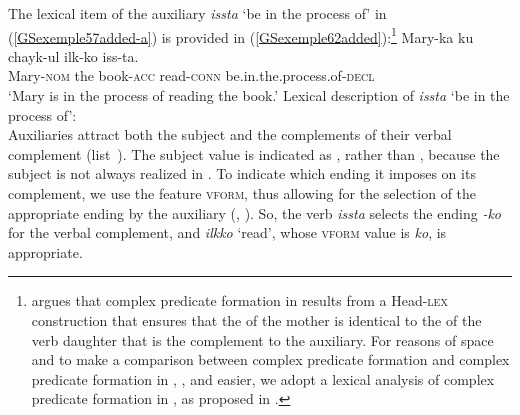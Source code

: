 The lexical item of the auxiliary \emph{issta} `be in the process of' in
(\ref{GSexemple57added-a}) is provided in (\ref{GSexemple62added}):\footnote{%
\citet[--95]{Kim2016a-u} argues that complex predicate formation in  results from a Head-\textsc{lex}
construction that ensures that the \compsl of the mother is identical to the \compsl of the verb
daughter that is the complement to the auxiliary. For reasons of space and to make a comparison
between  complex predicate formation and complex predicate formation in , , and
 easier, we adopt a lexical analysis of complex predicate formation in , as proposed in
.
}
\ea
\gll Mary-ka           ku   chayk-ul          ilk-ko  	         iss-ta.\\ 
     Mary-\textsc{nom} the  book-\textsc{acc} read-\textsc{conn} be.in.the.process.of-\textsc{decl}\\
\glt `Mary is in the process of reading the book.'\label{GSexemple57added-a}
\z
\ea
\label{GSexemple62added}
Lexical description of \emph{issta} `be in the process of': \\
\z
Auxiliaries attract both the subject  and the complements of their verbal complement (list \,). The subject value is indicated as , rather than \la{}\ra, because the subject is not always realized in . 
To indicate which ending it imposes on its complement, we use the feature \textsc{vform}, thus
allowing for the selection of the appropriate ending by the auxiliary (\citealt{Chung98a-u},
\citealt{Kim2016a-u}). So, the verb \emph{issta} selects the ending \emph{-ko} for the verbal
complement, and \emph{ilkko} `read', whose \textsc{vform} value is \emph{ko}, is appropriate. 




